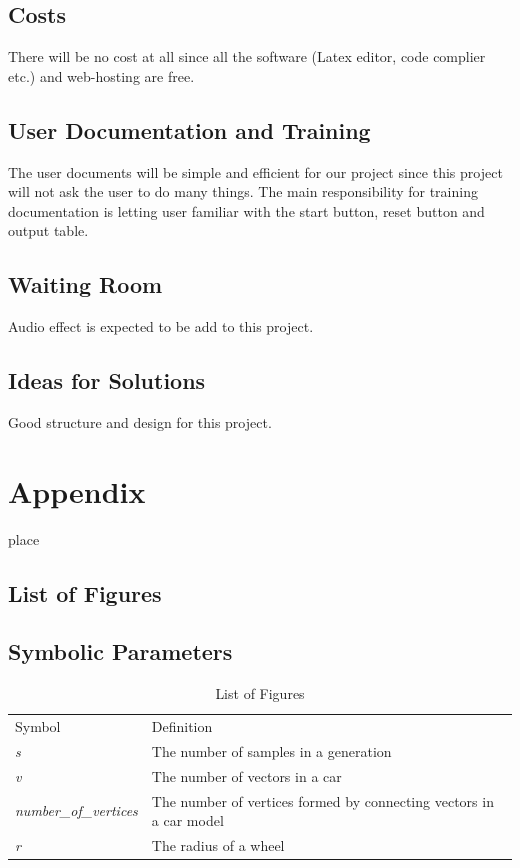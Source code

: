 \documentclass[12pt, titlepage]{article}
\begin{document}
\subsection{Costs}
There will be no cost at all since all the software (Latex editor, code 
complier etc.) and web-hosting are free. 

\subsection{User Documentation and Training}
The user documents will be simple and efficient for our project since this 
project will not ask the user to do many things. The main responsibility for 
training documentation is letting user familiar with the start button, reset 
button and output table.

\subsection{Waiting Room}
Audio effect is expected to be add to this project.

\subsection{Ideas for Solutions}
Good structure and design for this project.






\newpage

\section{Appendix}

place

\subsection{List of Figures}

\subsection{Symbolic Parameters}

\begin{table}[h!]
\centering
\label{LOF}
\begin{tabular}{ll}
Symbol & Definition \\
\textit{s} & The number of samples in a generation  \\
\textit{v} & The number of vectors in a car  \\
\textit{number\_of\_vertices} & The number of vertices formed by connecting 
vectors in a car model \\
\textit{r} & The radius of a wheel
\end{tabular}
\caption{List of Figures}
\end{table}
\end{document}
